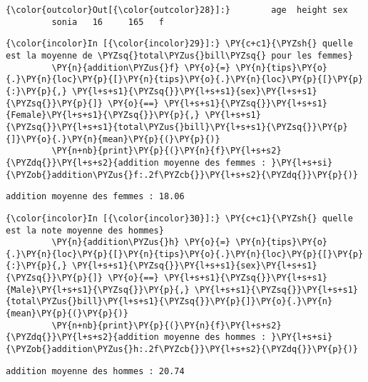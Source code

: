 \begin{Verbatim}[commandchars=\\\{\}]
{\color{outcolor}Out[{\color{outcolor}28}]:}        age  height sex
         sonia   16     165   f
\end{Verbatim}
            
    \begin{Verbatim}[commandchars=\\\{\}]
{\color{incolor}In [{\color{incolor}29}]:} \PY{c+c1}{\PYZsh{} quelle est la moyenne de \PYZsq{}total\PYZus{}bill\PYZsq{} pour les femmes}
         \PY{n}{addition\PYZus{}f} \PY{o}{=} \PY{n}{tips}\PY{o}{.}\PY{n}{loc}\PY{p}{[}\PY{n}{tips}\PY{o}{.}\PY{n}{loc}\PY{p}{[}\PY{p}{:}\PY{p}{,} \PY{l+s+s1}{\PYZsq{}}\PY{l+s+s1}{sex}\PY{l+s+s1}{\PYZsq{}}\PY{p}{]} \PY{o}{==} \PY{l+s+s1}{\PYZsq{}}\PY{l+s+s1}{Female}\PY{l+s+s1}{\PYZsq{}}\PY{p}{,} \PY{l+s+s1}{\PYZsq{}}\PY{l+s+s1}{total\PYZus{}bill}\PY{l+s+s1}{\PYZsq{}}\PY{p}{]}\PY{o}{.}\PY{n}{mean}\PY{p}{(}\PY{p}{)}
         \PY{n+nb}{print}\PY{p}{(}\PY{n}{f}\PY{l+s+s2}{\PYZdq{}}\PY{l+s+s2}{addition moyenne des femmes : }\PY{l+s+si}{\PYZob{}addition\PYZus{}f:.2f\PYZcb{}}\PY{l+s+s2}{\PYZdq{}}\PY{p}{)}
\end{Verbatim}


    \begin{Verbatim}[commandchars=\\\{\}]
addition moyenne des femmes : 18.06

    \end{Verbatim}

    \begin{Verbatim}[commandchars=\\\{\}]
{\color{incolor}In [{\color{incolor}30}]:} \PY{c+c1}{\PYZsh{} quelle est la note moyenne des hommes}
         \PY{n}{addition\PYZus{}h} \PY{o}{=} \PY{n}{tips}\PY{o}{.}\PY{n}{loc}\PY{p}{[}\PY{n}{tips}\PY{o}{.}\PY{n}{loc}\PY{p}{[}\PY{p}{:}\PY{p}{,} \PY{l+s+s1}{\PYZsq{}}\PY{l+s+s1}{sex}\PY{l+s+s1}{\PYZsq{}}\PY{p}{]} \PY{o}{==} \PY{l+s+s1}{\PYZsq{}}\PY{l+s+s1}{Male}\PY{l+s+s1}{\PYZsq{}}\PY{p}{,} \PY{l+s+s1}{\PYZsq{}}\PY{l+s+s1}{total\PYZus{}bill}\PY{l+s+s1}{\PYZsq{}}\PY{p}{]}\PY{o}{.}\PY{n}{mean}\PY{p}{(}\PY{p}{)}
         \PY{n+nb}{print}\PY{p}{(}\PY{n}{f}\PY{l+s+s2}{\PYZdq{}}\PY{l+s+s2}{addition moyenne des hommes : }\PY{l+s+si}{\PYZob{}addition\PYZus{}h:.2f\PYZcb{}}\PY{l+s+s2}{\PYZdq{}}\PY{p}{)}
\end{Verbatim}


    \begin{Verbatim}[commandchars=\\\{\}]
addition moyenne des hommes : 20.74

    \end{Verbatim}

